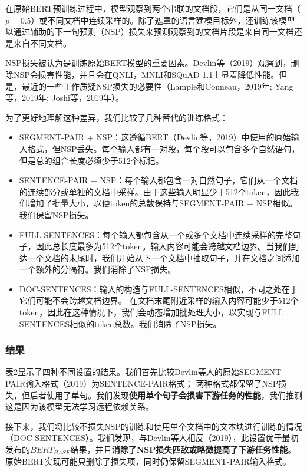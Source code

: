 \documentclass[lang=cn,11pt,a4paper,twocolumn]{elegantpaper}
\begin{document}
在原始BERT预训练过程中，模型观察到两个串联的文档段，它们是从同一文档（
$p = 0.5$）或不同文档中连续采样的。除了遮罩的语言建模目标外，还训练该模型以通过辅助的下一句预测（NSP）损失来预测观察到的文档片段是来自同一文档还是来自不同文档。

NSP损失被认为是训练原始BERT模型的重要因素。Devlin等（2019）观察到，删除NSP会损害性能，并且会在QNLI，MNLI和SQuAD 1.1上显着降低性能。但是，最近的一些工作质疑NSP损失的必要性（Lample和Conneau，2019年; Yang等，2019年; Joshi等，2019年）。

为了更好地理解这种差异，我们比较了几种替代的训练格式：

\begin{itemize}
  \item SEGMENT-PAIR + NSP：这遵循BERT（Devlin等，2019）中使用的原始输入格式，但NSP丢失。每个输入都有一对段，每个段可以包含多个自然语句，但是总的组合长度必须少于512个标记。
  \item SENTENCE-PAIR + NSP：每个输入都包含一对自然句子，它们从一个文档的连续部分或单独的文档中采样。由于这些输入明显少于512个token，因此我们增加了批量大小，以便token的总数保持与SEGMENT-PAIR + NSP相似。我们保留NSP损失。
  \item FULL-SENTENCES：每个输入都包含从一个或多个文档中连续采样的完整句子，因此总长度最多为512个token。输入内容可能会跨越文档边界。当我们到达一个文档的末尾时，我们开始从下一个文档中抽取句子，并在文档之间添加一个额外的分隔符。我们消除了NSP损失。
  \item DOC-SENTENCES：输入的构造与FULL-SENTENCES相似，不同之处在于它们可能不会跨越文档边界。 在文档末尾附近采样的输入内容可能少于512个token，因此在这种情况下，我们会动态增加批处理大小，以实现与FULL SENTENCES相似的token总数。我们消除了NSP损失。
\end{itemize}

\subsubsection*{结果}
表2显示了四种不同设置的结果。我们首先比较Devlin等人的原始SEGMENT-PAIR输入格式（2019）为SENTENCE-PAIR格式； 两种格式都保留了NSP损失，但后者使用了单句。我们发现\textbf{使用单个句子会损害下游任务的性能}，我们推测这是因为该模型无法学习远程依赖关系。

接下来，我们将比较不损失NSP的训练和使用单个文档中的文本块进行训练的情况（DOC-SENTENCES）。我们发现，与Devlin等人相反（2019），此设置优于最初发布的$BERT_{BASE}$结果，并且\textbf{消除了NSP损失匹敌或略微提高了下游任务性能}。原始BERT实现可能只删除了损失项，同时仍保留SEGMENT-PAIR输入格式。
\end{document}
